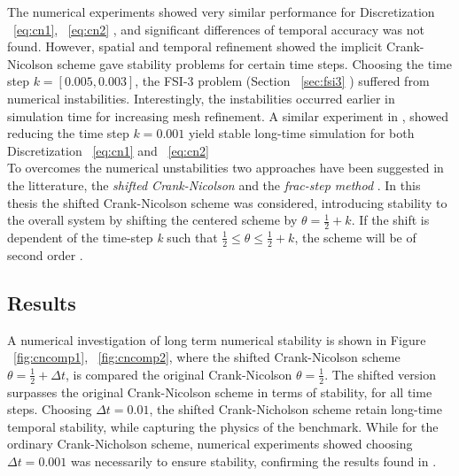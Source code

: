 \newpage

The numerical experiments showed very similar performance for Discretization  ~\ref{eq:cn1}, ~\ref{eq:cn2} , and significant differences of temporal accuracy was not found. However, spatial and temporal refinement showed the implicit Crank-Nicolson scheme gave stability problems for certain time steps. Choosing the time step $k = [0.005, 0.003]$, the FSI-3 problem (Section  ~\ref{sec:fsi3} ) suffered from numerical instabilities. Interestingly, the instabilities occurred earlier in simulation time for increasing mesh refinement. A similar experiment in  \cite{Wicka}, showed reducing the time step $k = 0.001$  yield stable long-time simulation for both  Discretization  ~\ref{eq:cn1} and ~\ref{eq:cn2}    \\

To overcomes the numerical unstabilities two approaches have been suggested in the litterature,  the \textit{shifted Crank-Nicolson}  and the \textit{frac-step method}  \cite{Richter2015, Wicka, Wick2013a}.  In this thesis the shifted Crank-Nicolson scheme was considered, introducing stability to the overall system by shifting the centered scheme  by $\theta = \frac{1}{2} + k$. If the shift is dependent of the time-step \textit{k} such that $\frac{1}{2} \leq \theta \leq \frac{1}{2} + k$, the scheme will be of second order \cite{Richter2015}. \\

\subsection{Results}
A numerical investigation of long term numerical stability is shown in Figure ~\ref{fig:cncomp1}, ~\ref{fig:cncomp2}, where the shifted Crank-Nicolson scheme $\theta = \frac{1}{2} + \Delta t$, is compared the original Crank-Nicolson $\theta = \frac{1}{2}$. The shifted version surpasses the original Crank-Nicolson scheme in terms of stability, for all time steps. Choosing $\Delta t = 0.01$, the shifted Crank-Nicholson scheme retain long-time temporal stability, while capturing the physics of the benchmark. While for the ordinary Crank-Nicholson scheme, numerical experiments showed choosing $\Delta t = 0.001$ was necessarily to ensure stability, confirming the results found in \cite{Wicka}.  \\

